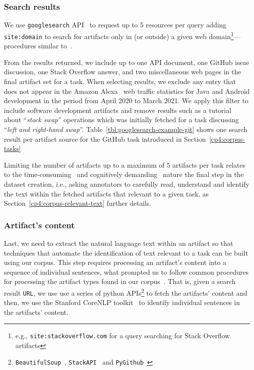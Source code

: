 \subsubsection{Search results}


We use \texttt{googlesearch} API~\cite{googlesearch} to 
request up to 5 resources per query
adding \texttt{site:domain} to search for artifacts 
only in (or outside) a given web domain\footnote{e.g., \texttt{site:stackoverflow.com} for a query searching for Stack Overflow artifacts}---procedures similar to~\cite{Xu2017}.



From the results returned, we include up to
one API document, one GitHub issue discussion, one Stack Overflow answer, and two miscellaneous web pages
in the final artifact set for a task. 
When selecting results, we exclude any entry that does not appear in the Amazon Alexa~\cite{alexa} web traffic statistics for Java and Android development in the period from April 2020 to March 2021. 
We apply this filter to include software development artifacts and remove results 
such as a tutorial about  ``\textit{stock swap}'' operations which was initially fetched 
for a task discussing ``\textit{left and right-hand swap}''.
Table~\ref{tbl:googlesearch-example-git} shows one search result per artifact source for the GitHub task introduced in Section~\ref{cp4:corpus-tasks}


Limiting the number of artifacts up to a maximum of 5 artifacts per task relates to the
time-consuming~\cite{al2017} and cognitively demanding~\cite{Piorkowski2016} 
nature the final step in the dataset creation, i.e.,  
asking annotators to carefully read, understand and identify the text
within the fetched artifacts that relevant to a given task,
as Section~\ref{cp4:corpus-relevant-text} further details.







\subsubsection{Artifact's content}

Last, we need to extract the natural language text within an artifact so that 
techniques that automate the identification of text relevant to a task can be built 
using our corpus.  This step requires processing an artifact's content 
into a sequence of individual sentences,
what prompted us to follow common procedures for processing the artifact types found in our corpus~\cite{Arya2019, nadi2020}.
That is, given a search result \texttt{URL}, we use use a series of python 
APIs\footnote{\texttt{BeautifulSoup}~\cite{beautifulsoup4},
\texttt{StackAPI}~\cite{StackAPI} and \texttt{PyGithub}~\cite{PyGithub}}
to fetch the artifacts' content
and then, we use the Stanford CoreNLP toolkit~\cite{CoreNLP} to identify 
individual sentences in the artifacts' content.







